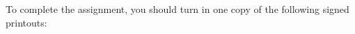 \noindent
To complete the assignment, you should turn in one copy of the following signed printouts: 
\vspace*{-.1in}
% 
% 		
% 
% 
% 
% 
% 

